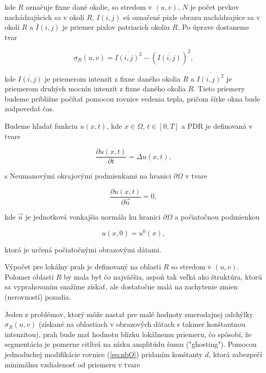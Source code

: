 \documentclass[a4paper,11pt,oneside]{article}%
\begin{document}
kde $R$ označuje fixne dané okolie, so stredom v $(u,v)$, $N$ je počet prvkov nachádzajúcich sa v okolí $R$, $I(i,j)$ sú označené pixle obrazu nachádzajúce sa v okolí $R$ a $\bar{I}(i,j)$ je priemer pixlov patriacich okoliu $R$. Po úprave dostaneme tvar

\begin{equation} 
\sigma_R(u,v) = \overline{I(i,j)^2} - (\overline{I(i,j)})^2,
\end{equation}

kde $\overline{I(i,j)}$ je priemerom intenzít z fixne daného okolia $R$ a $\overline{I(i,j)^2}$ je priemerom druhých mocnín intenzít z fixne daného okolia $R$. Tieto priemery budeme približne počítať pomocou rovnice vedenia tepla, pričom šírke okna bude zodpovedať čas. 

Budeme hľadať funkciu $u(x, t)$, kde $x \in \Omega$, $t \in [0, T]$ a PDR je definovaná v tvare

\begin{equation}
\frac{\partial u(x, t)}{\partial t} = \Delta u(x,t),
\end{equation}

s Neumanovými okrajovými podmienkami na hranici $\partial \Omega$ v tvare

\begin{equation}
\frac{\partial u(x, t)}{\partial \vec{n}} = 0,
\end{equation}

kde $\vec{n}$ je jednotková vonkajšia normála ku hranici $\partial \Omega$ a počiatočnou podmienkou 

\begin{equation}
u(x, 0) = u^0(x),
\end{equation}

ktorá je určená počiatočnými obrazovými dátami.

Výpočet pre lokálny prah je definovaný na oblasti $R$ so stredom v $(u, v)$. Polomer oblasti $R$ by mala byť čo najväčšia, aspoň tak veľká ako štruktúra, ktorú sa vyprahovaním snažíme získať, ale dostatočne malá na zachytenie zmien (nerovností) pozadia.

Jeden z problémov, ktorý môže nastať pre malé hodnoty smerodajnej odchýlky $\sigma_R(u,v)$ (získané na oblastiach v obrazových dátach s takmer konštantnou intenzitou), prah bude mať hodnotu blízku lokálnemu priemeru, čo spôsobí, že segmentácia je pomerne citlivá na nízku amplitúdu šumu ("ghosting"). Pomocou jednoduchej modifikácie rovnice (\ref{eq:nbO}) pridaním konštanty $d$, ktorá zabezpečí minimálnu vzdialenosť od priemeru v tvare
\end{document}
